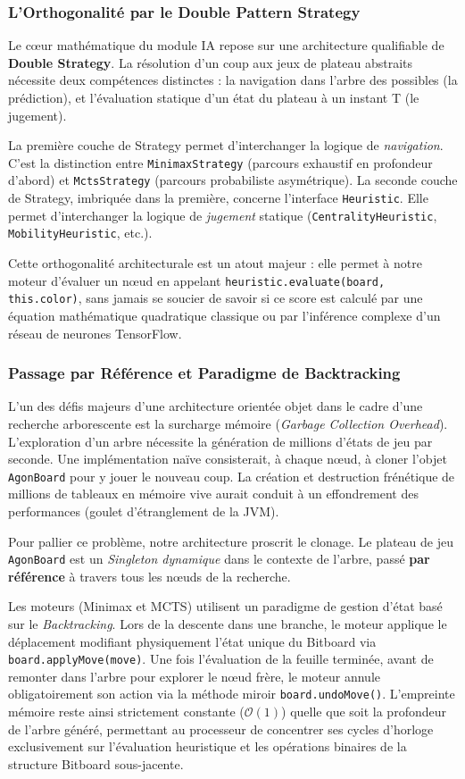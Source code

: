 \documentclass[a4paper]{article}
\begin{document}
\subsubsection{L'Orthogonalité par le Double Pattern Strategy}
Le cœur mathématique du module IA repose sur une architecture qualifiable de \textbf{Double Strategy}. La résolution d'un coup aux jeux de plateau abstraits nécessite deux compétences distinctes : la navigation dans l'arbre des possibles (la prédiction), et l'évaluation statique d'un état du plateau à un instant T (le jugement).

La première couche de Strategy permet d'interchanger la logique de \textit{navigation}. C'est la distinction entre \texttt{MinimaxStrategy} (parcours exhaustif en profondeur d'abord) et \texttt{MctsStrategy} (parcours probabiliste asymétrique). 
La seconde couche de Strategy, imbriquée dans la première, concerne l'interface \texttt{Heuristic}. Elle permet d'interchanger la logique de \textit{jugement} statique (\texttt{CentralityHeuristic}, \texttt{MobilityHeuristic}, etc.). 

Cette orthogonalité architecturale est un atout majeur : elle permet à notre moteur d'évaluer un nœud en appelant \texttt{heuristic.evaluate(board, this.color)}, sans jamais se soucier de savoir si ce score est calculé par une équation mathématique quadratique classique ou par l'inférence complexe d'un réseau de neurones TensorFlow.

\subsubsection{Passage par Référence et Paradigme de Backtracking}
L'un des défis majeurs d'une architecture orientée objet dans le cadre d'une recherche arborescente est la surcharge mémoire (\textit{Garbage Collection Overhead}). L'exploration d'un arbre nécessite la génération de millions d'états de jeu par seconde. Une implémentation naïve consisterait, à chaque nœud, à cloner l'objet \texttt{AgonBoard} pour y jouer le nouveau coup. La création et destruction frénétique de millions de tableaux en mémoire vive aurait conduit à un effondrement des performances (goulet d'étranglement de la JVM).

Pour pallier ce problème, notre architecture proscrit le clonage. Le plateau de jeu \texttt{AgonBoard} est un \textit{Singleton dynamique} dans le contexte de l'arbre, passé \textbf{par référence} à travers tous les nœuds de la recherche. 

Les moteurs (Minimax et MCTS) utilisent un paradigme de gestion d'état basé sur le \textit{Backtracking}. Lors de la descente dans une branche, le moteur applique le déplacement modifiant physiquement l'état unique du Bitboard via \texttt{board.applyMove(move)}. Une fois l'évaluation de la feuille terminée, avant de remonter dans l'arbre pour explorer le nœud frère, le moteur annule obligatoirement son action via la méthode miroir \texttt{board.undoMove()}. L'empreinte mémoire reste ainsi strictement constante (\(\mathcal{O}(1)\)) quelle que soit la profondeur de l'arbre généré, permettant au processeur de concentrer ses cycles d'horloge exclusivement sur l'évaluation heuristique et les opérations binaires de la structure Bitboard sous-jacente.
\end{document}
